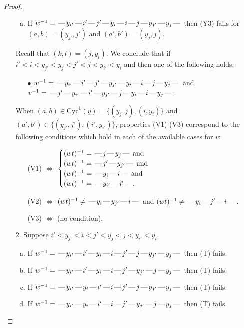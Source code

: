 \documentclass[10pt]{article}
\theoremstyle{definition}
\theoremstyle{definition}
\def\dash{\text{\hspace{0.5mm}---\hspace{0.5mm}}}
\def\Cyc{\mathrm{Cyc}}
\begin{document}
\begin{proof}
\begin{enumerate}
\begin{enumerate}[(a)]
\item If $w^{-1} = \dash y_{i'}\dash i'\dash j'\dash y_i\dash i\dash j\dash y_{j'}\dash y_j\dash $ then (Y3) fails for $(a,b)=(y_{j'},j')$ and $(a',b')=(y_j,j)$.
\end{enumerate}
Recall that $(k,l) = (j,y_i)$.
We conclude that if $i' < i < y_{j'} < y_j < j' < j < y_{i'} < y_i$ and then one of the following holds:
\begin{enumerate}
\item[$\bullet$] $w^{-1} = \dash y_{i'}\dash i'\dash j'\dash y_{j'}\dash y_i\dash i\dash j\dash y_j\dash $ and $v^{-1} = \dash j'\dash y_{i'}\dash i'\dash y_{j'}\dash j\dash y_i\dash i\dash y_j\dash $.
\end{enumerate}
When $(a,b)\in\Cyc^1(y)=\{(y_j,j),(i,y_i)\}$ and $(a',b')\in\{(y_{j'},j'),(i',y_{i'})\}$,
properties (V1)-(V3) correspond to the following conditions which hold in
each of the available cases for $v$:
\begin{enumerate}
\item[](V1) $\Leftrightarrow$ $\begin{cases}\text{$(wt)^{-1} = \dash j \dash y_j \dash$}\text{ and }\\
\text{$(wt)^{-1} = \dash j' \dash y_{j'} \dash$}\text{ and }\\
\text{$(wt)^{-1} = \dash y_i \dash i \dash$}\text{ and }\\
\text{$(wt)^{-1} = \dash y_{i'} \dash i' \dash$}.\end{cases}$
\item[](V2) $\Leftrightarrow$ $(wt)^{-1} \neq \dash y_i \dash y_{j'} \dash i \dash$ and $(wt)^{-1}\neq \dash y_i \dash j' \dash i \dash$.
\item[](V3) $\Leftrightarrow$ (no condition).
\end{enumerate}
\item[$2$.] Suppose $i' < y_{j'} < i < j' < y_j < j < y_{i'} < y_i$.
\begin{enumerate}[(a)]
\item If $w^{-1} = \dash y_{i'}\dash i'\dash y_i\dash i\dash j'\dash j\dash y_{j'}\dash y_j\dash $ then (T) fails.
\item If $w^{-1} = \dash y_{i'}\dash i'\dash y_i\dash i\dash j'\dash y_{j'}\dash j\dash y_j\dash $ then (T) fails.
\item If $w^{-1} = \dash y_{i'}\dash y_i\dash i'\dash i\dash j'\dash j\dash y_{j'}\dash y_j\dash $ then (T) fails.
\item If $w^{-1} = \dash y_{i'}\dash y_i\dash i'\dash i\dash j'\dash y_{j'}\dash j\dash y_j\dash $ then (T) fails.

\end{enumerate}
\end{enumerate}
\end{proof}
\end{document}
